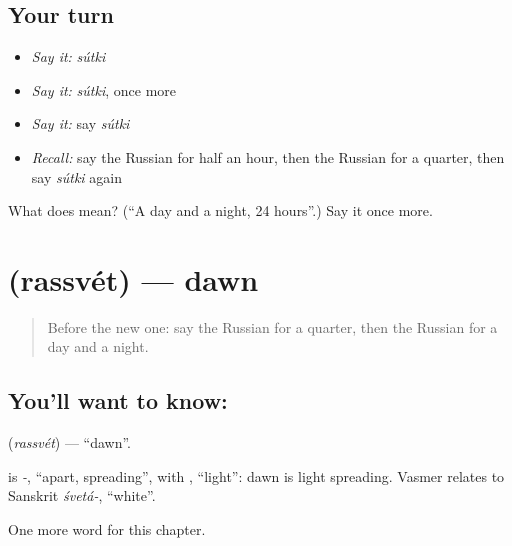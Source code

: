 \subsection*{Your turn}
\begin{itemize}
\raggedright
  \item \emph{Say it:} \emph{sútki}
  \item \emph{Say it:} \emph{sútki}, once more
  \item \emph{Say it:} say \emph{sútki}
  \item \emph{Recall:} say the Russian for half an hour, then the Russian for a quarter, then say \emph{sútki} again
\end{itemize}

\begin{tcolorbox}[breakable,colback=teal!4,colframe=teal!35!black,title={Before you move on}]
What does  mean? (\textquotedblleft{}A day and a night, 24 hours\textquotedblright{}.) Say it once more.
\end{tcolorbox}
\section[\texorpdfstring{\ru{рассвет} (rassvét)}{рассвет (rassvét)}]{ (rassvét) — dawn}

\label{lesson:RU-C149-rassvet}



\begin{quote}
Before the new one: say the Russian for a quarter, then the Russian for a day and a night.
\end{quote}

\subsection*{You'll want to know: }
\textbf{} (\emph{rassvét}) — \textquotedblleft{}dawn\textquotedblright{}.

\begin{cousinweb}
\textbf{} is \emph{-}, \textquotedblleft{}apart, spreading\textquotedblright{}, with \emph{}, \textquotedblleft{}light\textquotedblright{}: dawn is light spreading. Vasmer relates \emph{} to Sanskrit \emph{śvetá-}, \textquotedblleft{}white\textquotedblright{}.
\end{cousinweb}

\begin{grammarlens}[title={What you've built}]
One more word for this chapter.
\end{grammarlens}

